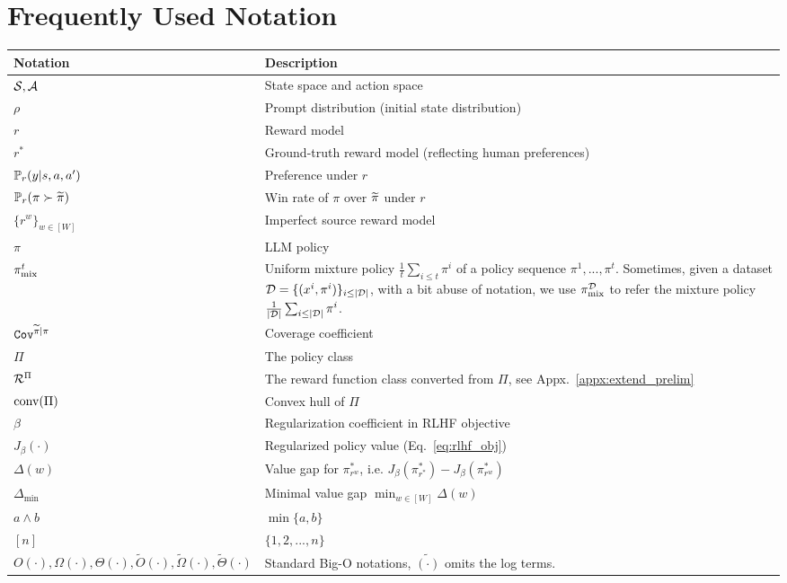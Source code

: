 \section{Frequently Used Notation}\label{appx:freq_notations}

\begin{table}[h]
    \centering
    \def\arraystretch{1.2}
    \begin{tabular}{ll}
        \hline
        \textbf{Notation} & \textbf{Description} \\
        \hline
        $\mathcal{S},\mathcal{A}$ & State space and action space \\
        $\rho$ & Prompt distribution (initial state distribution) \\
        $r$ & Reward model \\
        $r^*$ & Ground-truth reward model (reflecting human preferences) \\
        ${\mathbb{P}}_r(y|s,a,a')$ & Preference under $r$ \\
        ${\mathbb{P}}_r(\pi\succ\widetilde{\pi})$ & Win rate of $\pi$ over $\widetilde{\pi}$ under $r$ \\
        $\{r^w\}_{w\in[W]}$ & Imperfect source reward model \\
        $\pi$ & LLM policy \\
        $\pi^t_{\text{mix}}$ & \makecell[tl]{Uniform mixture policy $\frac{1}{t}\sum_{i\leq t}\pi^i$ of a policy sequence $\pi^1,...,\pi^t$. \\ Sometimes, given a dataset $\mathcal{D}=\{(x^i,\pi^i)\}_{i\leq |\mathcal{D}|}$, with a bit abuse of notation, \\ we use $\pi^{\mathcal{D}}_{\text{mix}}$ to refer the mixture policy $\frac{1}{|\mathcal{D}|}\sum_{i\leq|\mathcal{D}|} \pi^i$.} \\
        ${\texttt{Cov}}^{\widetilde{\pi}|\pi}$ & Coverage coefficient \\
        $\Pi$ & The policy class \\
        $\mathcal{R}^\Pi$ & The reward function class converted from $\Pi$, see Appx.~\ref{appx:extend_prelim}\\
        $\text{conv}(\Pi)$ & Convex hull of $\Pi$ \\
        $\beta$ & Regularization coefficient in RLHF objective \\
        $J_\beta(\cdot)$ & Regularized policy value (Eq.~\eqref{eq:rlhf_obj})\\
        $\Delta(w)$ & Value gap for $\pi^*_{r^w}$, i.e. $J_\beta(\pi^*_{r^*}) - J_\beta(\pi^*_{r^w})$\\
        $\Delta_{\min}$ & Minimal value gap $\min_{w\in[W]} \Delta(w)$ \\
        $a \wedge b$ & $\min\{a,b\}$ \\
        $[n]$ & $\{1,2,...,n\}$ \\
        $O(\cdot),\Omega(\cdot),\Theta(\cdot),\tilde{O}(\cdot),\tilde{\Omega}(\cdot),\tilde{\Theta}(\cdot)$ & Standard Big-O notations, $\tilde{(\cdot)}$ omits the log terms.\\
        \hline
        
    \end{tabular}
\end{table}

